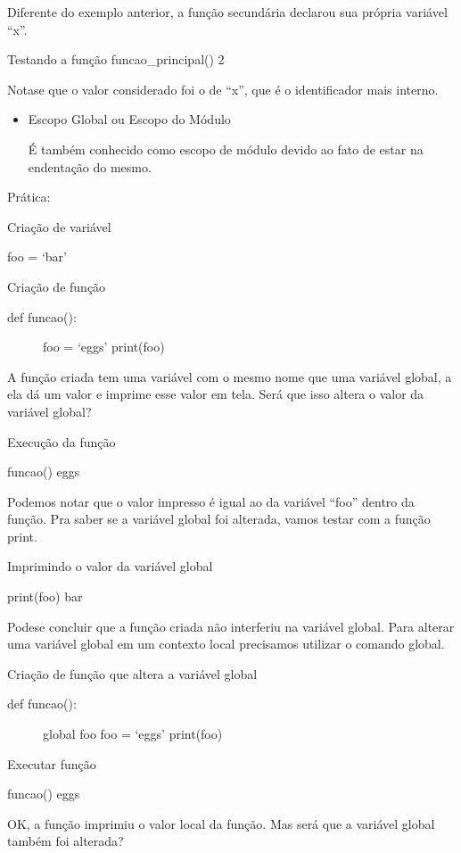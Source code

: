 \documentclass[letterpaper,10pt,brazil]{sphinxmanual}
\begin{document}
Diferente do exemplo anterior, a função secundária declarou sua própria variável “x”.

Testando a função
funcao\_principal()
2

Nota\sphinxhyphen{}se que o valor considerado foi o de “x”, que é o identificador mais interno.
\begin{itemize}
\item {} 
Escopo Global ou Escopo do Módulo

É também conhecido como escopo de módulo devido ao fato de estar na endentação do mesmo.

\end{itemize}

Prática:

Criação de variável

foo = ‘bar’

Criação de função
\begin{description}
\item[{def funcao():}] \leavevmode
foo = ‘eggs’
print(foo)

\end{description}

A função criada tem uma variável com o mesmo nome que uma variável global, a ela dá um valor e
imprime esse valor em tela.
Será que isso altera o valor da variável global?

Execução da função

funcao()
eggs

Podemos notar que o valor impresso é igual ao da variável “foo” dentro da função.
Pra saber se a variável global foi alterada, vamos testar com a função print.

Imprimindo o valor da variável global

print(foo)
bar

Pode\sphinxhyphen{}se concluir que a função criada não interferiu na variável global.
Para alterar uma variável global em um contexto local precisamos utilizar o comando global.

Criação de função que altera a variável global
\begin{description}
\item[{def funcao():}] \leavevmode
global foo
foo = ‘eggs’
print(foo)

\end{description}

Executar função

funcao()
eggs

OK, a função imprimiu o valor local da função.
Mas será que a variável global também foi alterada?
\end{document}
